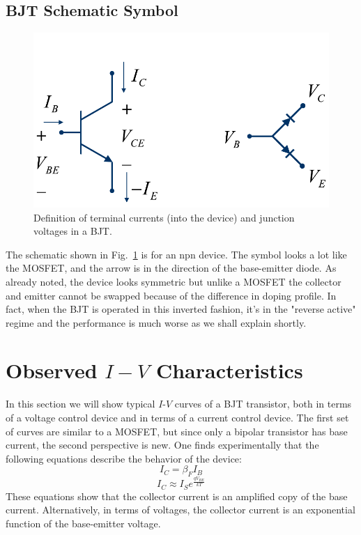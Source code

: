 \subsection{BJT Schematic Symbol}
\begin{figure}[tb]
\centering
\includegraphics[width=.6\columnwidth]{slide5_bjt_schematic}
\caption{Definition of terminal currents (into the device) and junction voltages in a BJT.} \label{fig:slide5_bjt_schematic}
\end{figure}
The schematic shown in Fig.~\ref{fig:slide5_bjt_schematic} is for an npn device.  The symbol looks a lot like the MOSFET, and the arrow is in the direction of the base-emitter diode.  As already noted, the device looks symmetric but unlike a MOSFET the collector and emitter cannot be swapped because of the difference in doping profile. In fact, when the BJT is operated in this inverted fashion, it's in the "reverse active" regime and the performance is much worse as we shall explain shortly. 
\section{Observed \texorpdfstring{$I-V$}{I-V} Characteristics}
In this section we will show typical $I$-$V$ curves of a BJT transistor, both in terms of a voltage control device and in terms of a current control device.  The first set of curves are similar to a MOSFET, but since only a bipolar transistor has base current, the second perspective is new.  One finds experimentally that the following equations describe the behavior of the device:
    \begin{equation}
        {I_C} = \beta_F {I_B}
    \end{equation}
    \begin{equation}
        {I_C} \approx {I_S}{e^{\frac{{q{V_{BE}}}}{{kT}}}}
    \end{equation}
These equations show that the collector current is an amplified copy of the base current.  Alternatively, in terms of voltages, the collector current is an exponential function of the base-emitter voltage.
